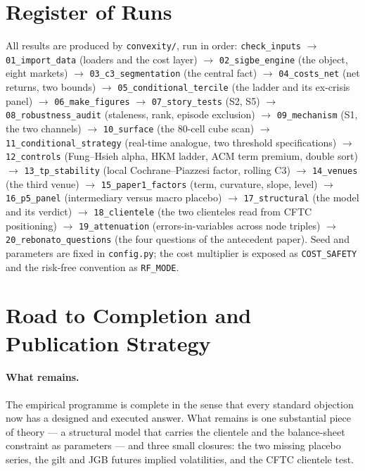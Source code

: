 \documentclass[11pt]{article}
\begin{document}
\section{Register of Runs}\label{sec:register}
All results are produced by \texttt{convexity/}, run in order:
\texttt{check\_inputs} $\to$ \texttt{01\_import\_data} (loaders and the cost layer) $\to$
\texttt{02\_sigbe\_engine} (the object, eight markets) $\to$ \texttt{03\_c3\_segmentation} (the central
fact) $\to$ \texttt{04\_costs\_net} (net returns, two bounds) $\to$
\texttt{05\_conditional\_tercile} (the ladder and its ex-crisis panel) $\to$ \texttt{06\_make\_figures}
$\to$ \texttt{07\_story\_tests} (S2, S5) $\to$ \texttt{08\_robustness\_audit} (staleness, rank,
episode exclusion) $\to$ \texttt{09\_mechanism} (S1, the two channels) $\to$ \texttt{10\_surface} (the
80-cell cube scan) $\to$ \texttt{11\_conditional\_strategy} (real-time analogue, two threshold
specifications) $\to$ \texttt{12\_controls} (Fung--Hsieh alpha, HKM ladder, ACM term premium, double
sort) $\to$ \texttt{13\_tp\_stability} (local Cochrane--Piazzesi factor, rolling C3) $\to$
\texttt{14\_venues} (the third venue) $\to$ \texttt{15\_paper1\_factors} (term, curvature, slope,
level) $\to$ \texttt{16\_p5\_panel} (intermediary versus macro placebo) $\to$
\texttt{17\_structural} (the model and its verdict) $\to$ \texttt{18\_clientele} (the two clienteles read from CFTC positioning) $\to$ \texttt{19\_attenuation} (errors-in-variables across node triples) $\to$ \texttt{20\_rebonato\_questions} (the four questions of the antecedent paper). Seed and parameters are fixed in
\texttt{config.py}; the cost multiplier is exposed as \texttt{COST\_SAFETY} and the risk-free
convention as \texttt{RF\_MODE}.

\section{Road to Completion and Publication Strategy}\label{sec:road}

\paragraph{What remains.} The empirical programme is complete in the sense that every standard
objection now has a designed and executed answer. What remains is one substantial piece of theory ---
a structural model that carries the clientele and the balance-sheet constraint as parameters --- and
three small closures: the two missing placebo series, the gilt and JGB futures implied volatilities,
and the CFTC clientele test.
\end{document}
